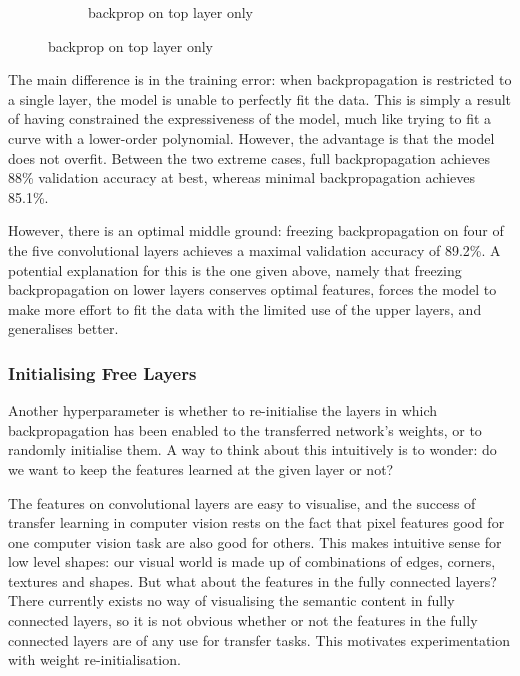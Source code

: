 \documentclass[a4paper,11pt]{article}
\begin{document}
\begin{figure}
\begin{minipage}[b]{\textwidth}
\begin{subfigure}{.5\textwidth}
        \caption{backprop on top layer only}\label{fig:2b}
      \end{subfigure} \par \vspace*{20pt} %
    \end{minipage}%
\end{figure}

The main difference is in the training error: when backpropagation is restricted to a single layer, the model is unable to perfectly fit the data. This is simply a result of having constrained the expressiveness of the model, much like trying to fit a curve with a lower-order polynomial. However, the advantage is that the model does not overfit. Between the two extreme cases, full backpropagation achieves 88\% validation accuracy at best, whereas minimal backpropagation achieves 85.1\%. 

However, there is an optimal middle ground: freezing backpropagation on four of the five convolutional layers achieves a maximal validation accuracy of 89.2\%. A potential explanation for this is the one given above, namely that freezing backpropagation on lower layers conserves optimal features, forces the model to make more effort to fit the data with the limited use of the upper layers, and generalises better. \\


\subsubsection{Initialising Free Layers}

Another hyperparameter is whether to re-initialise the layers in which backpropagation has been enabled to the transferred network's weights, or to randomly initialise them. A way to think about this intuitively is to wonder: do we want to keep the features learned at the given layer or not? 

The features on convolutional layers are easy to visualise, and the success of transfer learning in computer vision rests on the fact that pixel features good for one computer vision task are also good for others. This makes intuitive sense for low level shapes: our visual world is made up of combinations of edges, corners, textures and shapes. But what about the features in the fully connected layers? There currently exists no way of visualising the semantic content in fully connected layers, so it is not obvious whether or not the features in the fully connected layers are of any use for transfer tasks. This motivates experimentation with weight re-initialisation. 
\end{document}
